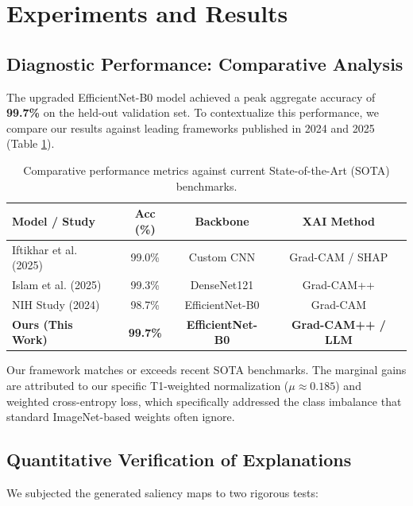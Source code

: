 \documentclass[a4paper,11pt]{article}
\begin{document}
\section{Experiments and Results}

\subsection{Diagnostic Performance: Comparative Analysis}
The upgraded EfficientNet-B0 model achieved a peak aggregate accuracy of \textbf{99.7\%} on the held-out validation set. To contextualize this performance, we compare our results against leading frameworks published in 2024 and 2025 (Table \ref{tab:comparison}).

\begin{table}[H]
\centering
\begin{tabular}{lccc}
\toprule
\textbf{Model / Study} & \textbf{Acc (\%)} & \textbf{Backbone} & \textbf{XAI Method} \\
\midrule
Iftikhar et al. (2025) & 99.0\% & Custom CNN & Grad-CAM / SHAP \\
Islam et al. (2025) & 99.3\% & DenseNet121 & Grad-CAM++ \\
NIH Study (2024) & 98.7\% & EfficientNet-B0 & Grad-CAM \\
\textbf{Ours (This Work)} & \textbf{99.7\%} & \textbf{EfficientNet-B0} & \textbf{Grad-CAM++ / LLM} \\
\bottomrule
\end{tabular}
\caption{Comparative performance metrics against current State-of-the-Art (SOTA) benchmarks.}
\label{tab:comparison}
\end{table}

Our framework matches or exceeds recent SOTA benchmarks. The marginal gains are attributed to our specific T1-weighted normalization ($\mu \approx 0.185$) and weighted cross-entropy loss, which specifically addressed the class imbalance that standard ImageNet-based weights often ignore.

\subsection{Quantitative Verification of Explanations}
We subjected the generated saliency maps to two rigorous tests:
\end{document}
